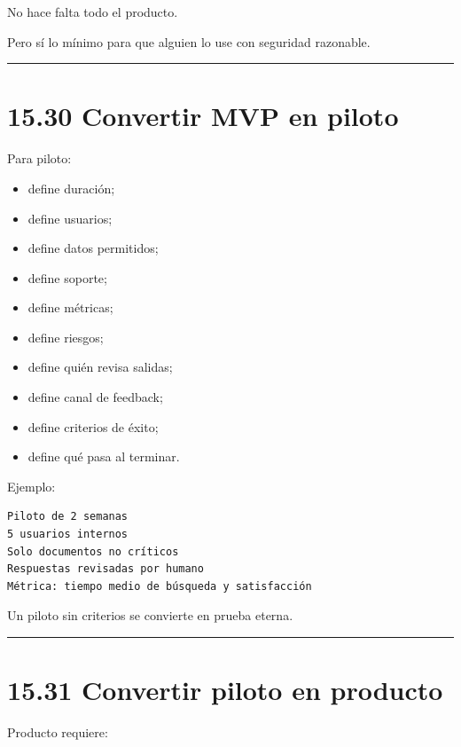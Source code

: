No hace falta todo el producto.

Pero sí lo mínimo para que alguien lo use con seguridad razonable.

\begin{center}\rule{0.5\linewidth}{0.5pt}\end{center}

\section{15.30 Convertir MVP en piloto}\label{convertir-mvp-en-piloto}

Para piloto:

\begin{itemize}
\tightlist
\item
  define duración;
\item
  define usuarios;
\item
  define datos permitidos;
\item
  define soporte;
\item
  define métricas;
\item
  define riesgos;
\item
  define quién revisa salidas;
\item
  define canal de feedback;
\item
  define criterios de éxito;
\item
  define qué pasa al terminar.
\end{itemize}

Ejemplo:

\begin{lstlisting}
Piloto de 2 semanas
5 usuarios internos
Solo documentos no críticos
Respuestas revisadas por humano
Métrica: tiempo medio de búsqueda y satisfacción
\end{lstlisting}

Un piloto sin criterios se convierte en prueba eterna.

\begin{center}\rule{0.5\linewidth}{0.5pt}\end{center}

\section{15.31 Convertir piloto en
producto}\label{convertir-piloto-en-producto}

Producto requiere:

